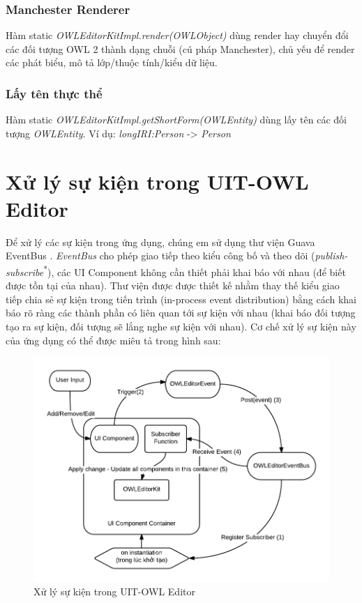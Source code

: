 \subsubsection{Manchester Renderer}
Hàm static \textit{OWLEditorKitImpl.render(OWLObject)} dùng render hay chuyển đổi các đối tượng OWL 2 thành dạng chuỗi (cú pháp Manchester), chủ yếu để render các phát biểu, mô tả lớp/thuộc tính/kiểu dữ liệu.
\subsubsection{Lấy tên thực thể}
Hàm static \textit{OWLEditorKitImpl.getShortForm(OWLEntity)} dùng lấy tên các đối tượng \textit{OWLEntity}. Ví dụ: \textit{longIRI:Person} -> \textit{Person}


\section{Xử lý sự kiện trong UIT-OWL Editor}
{\let\thefootnote\relax{}
}
Để xử lý các sự kiện trong ứng dụng, chúng em sử dụng thư viện Guava EventBus \cite{guava}. \textit{EventBus} cho phép giao tiếp theo kiểu công bố và theo dõi (\textit{publish-subscribe}\textsuperscript{*}), các UI Component không cần thiết phải khai báo với nhau (để biết được tồn tại của nhau). Thư viện được được thiết kế nhằm thay thế kiểu giao tiếp chia sẻ sự kiện trong tiến trình (in-process event distribution) bằng cách khai báo rõ ràng các thành phần có liên quan tới sự kiện với nhau (khai báo đối tượng tạo ra sự kiện, đối tượng sẽ lắng nghe sự kiện với nhau). Cơ chế xử lý sự kiện này của ứng dụng có thể được miêu tả trong hình sau:
\begin{figure}[h!]
	\centering
	\includegraphics[width=145mm]{Figures/owleditor_eventBus.png}
	\caption{Xử lý sự kiện trong UIT-OWL Editor\label{overflow}}
\end{figure}
